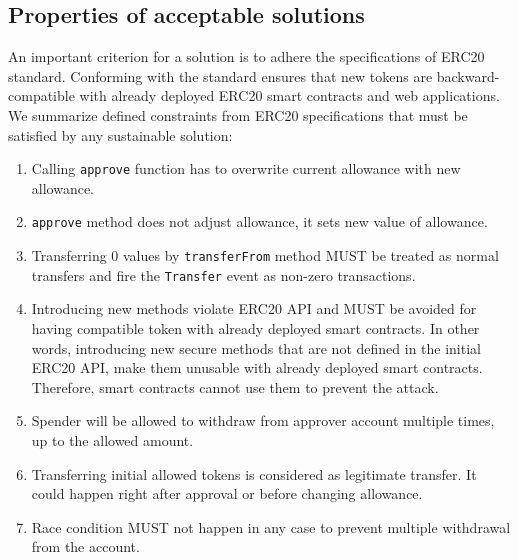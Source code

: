 \subsection{Properties of acceptable solutions}
An important criterion for a solution is to adhere the specifications of ERC20 standard. Conforming with the standard ensures that new tokens are backward-compatible with already deployed ERC20 smart contracts and web applications. We summarize defined constraints from ERC20 specifications \cite{Ref08} that must be satisfied by any sustainable solution:


\begin{enumerate}
	\item Calling \texttt{approve} function has to overwrite current allowance with new allowance.
	\item \texttt{approve} method does not adjust allowance, it sets new value of allowance.
	\item Transferring 0 values by \texttt{transferFrom} method MUST be treated as normal transfers and fire the \texttt{Transfer} event as non-zero transactions.
	\item Introducing new methods violate ERC20 API and MUST be avoided for having compatible token with already deployed smart contracts. In other words, introducing new secure methods that are not defined in the initial ERC20 API, make them unusable with already deployed smart contracts. Therefore, smart contracts cannot use them to prevent the attack.
	\item Spender will be allowed to withdraw from approver account multiple times, up to the allowed amount.
	\item Transferring initial allowed tokens is considered as legitimate transfer. It could happen right after approval or before changing allowance.
	\item Race condition MUST not happen in any case to prevent multiple withdrawal from the account.
\end{enumerate}